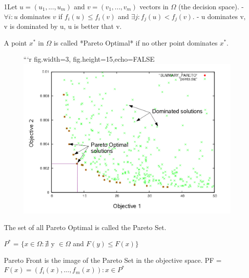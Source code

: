 1Let $u = (u_1, ..., u_m)$ and $v = (v_1, ..., v_m)$ vectors in $\Omega$ (the decision space).
- $\forall i:u$ dominates $v$ if $f_i(u) \leq f_i(v)$ and $\exists j:f_j(u) < f_j(v)$.
- u dominates v, v is dominated by u, u is better that v.

 A point $x^*$ in $\Omega$  is called *Pareto Optimal* if no other point dominates $x^*$. 


\begin{figure}[!t]
\centering
```{r fig.width=3, fig.height=15,echo=FALSE}
\includegraphics[width=\textwidth]{images/pareto_dominated.png}
\end{figure}

The set of all Pareto Optimal is called the Pareto Set. 

$P^\ast$ = $\{x \in \Omega: \nexists$ y $\in \Omega$ and $F(y) \leq F(x)\}$

 Pareto Front is the image of the Pareto Set in the objective space.
 PF = {$F(x) = (f_i(x), ..., f_m(x)): x \in P^*$}

